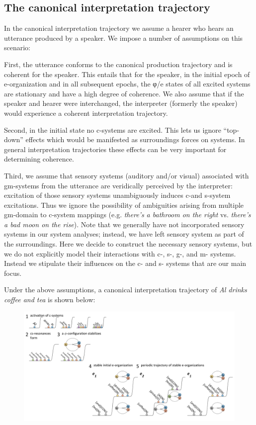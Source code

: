 \subsection{The canonical interpretation trajectory}

In the canonical interpretation trajectory we assume a hearer who hears an utterance produced by a speaker. We impose a number of assumptions on this scenario:

First, the utterance conforms to the canonical production trajectory and is coherent for the speaker. This entails that for the speaker, in the initial epoch of e-organization and in all subsequent epochs, the φ/e states of all excited systems are stationary and have a high degree of coherence. We also assume that if the speaker and hearer were interchanged, the interpreter (formerly the speaker) would experience a coherent interpretation trajectory. 

Second, in the initial state no c-systems are excited. This lets us ignore “top-down” effects which would be manifested as surroundings forces on systems. In general interpretation trajectories these effects can be very important for determining coherence.

Third, we assume that sensory systems (auditory and/or visual) associated with gm-systems from the utterance are veridically perceived by the interpreter: excitation of those sensory systems unambiguously induces c-and s-system excitations. Thus we ignore the possibility of ambiguities arising from multiple gm-domain to c-system mappings (e.g. \textit{there’s a bathroom on the right} vs. \textit{there’s a bad moon on the rise}). Note that we generally have not incorporated sensory systems in our system analyses; instead, we have left sensory system as part of the surroundings. Here we decide to construct the necessary sensory systems, but we do not explicitly model their interactions with c-, s-, g-, and m- systems. Instead we stipulate their influences on the c- and s- systems that are our main focus.

Under the above assumptions, a canonical interpretation trajectory of \textit{Al drinks coffee and tea} is shown below:

  
\begin{figure}
\includegraphics[width=\textwidth]{figures/Tilsen-img121.png}
\caption{\missingcaption}
\label{fig:}
\end{figure}
 

